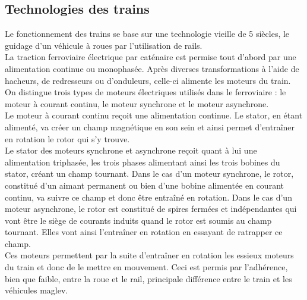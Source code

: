 \documentclass[12pt, a4paper, onecolumn]{article}
\renewcommand{\tab}{\tabto{15px}}
\begin{document}
\subsection{Technologies des trains}
\tab Le fonctionnement des trains se base sur une technologie vieille de 5 siècles, le guidage d’un véhicule à roues par l’utilisation de rails. \\
\tab La traction ferroviaire électrique par caténaire est permise tout d'abord par une alimentation continue ou monophasée.
Après diverses transformations à l'aide de hacheurs, de redresseurs ou d'onduleurs, celle-ci alimente les moteurs du train. \\
\linebreak
\tab On distingue trois types de moteurs électriques utilisés dans le ferroviaire : le moteur à courant continu, le moteur synchrone et le moteur asynchrone. \\
\tab Le moteur à courant continu reçoit une alimentation continue.
Le stator, en étant alimenté, va créer un champ magnétique en son sein et ainsi permet d'entraîner en rotation le rotor qui s'y trouve. \\
\tab Le stator des moteurs synchrone et asynchrone reçoit quant à lui une alimentation triphasée, les trois phases alimentant ainsi les trois bobines du stator, créant un champ tournant.
Dans le cas d'un moteur synchrone, le rotor, constitué d'un aimant permanent ou bien d'une bobine alimentée en courant continu, va suivre ce champ et donc être entraîné en rotation.
Dans le cas d'un moteur asynchrone, le rotor est constitué de spires fermées et indépendantes qui vont être le siège de courants induits quand le rotor est soumis au champ tournant.
Elles vont ainsi l'entraîner en rotation en essayant de ratrapper ce champ. \\
\tab Ces moteurs permettent par la suite d'entraîner en rotation les essieux moteurs du train et donc de le mettre en mouvement.
Ceci est permis par l’adhérence, bien que faible, entre la roue et le rail, principale différence entre le train et les véhicules maglev.
\end{document}
